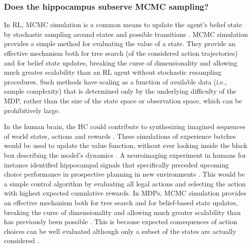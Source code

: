 \documentclass[10pt,letterpaper]{article}
\begin{document}
\subsubsection{Does the hippocampus subserve MCMC sampling?}
In RL, MCMC simulation is a common means to update the agent's belief state
by stochastic sampling around states and possible transitions \citep{daw2014algorithmic}.
MCMC simulation provides a simple method for evaluating the value of a state.
They provide an effective mechanism both for tree search (of the considered
action trajectories)
and for belief state updates, breaking the curse of dimensionality and allowing much greater scalability than an RL agent without stochastic resampling procedures.
Such methods have scaling as a function of available data (i.e., sample complexity) that
is determined only by the underlying difficulty of the MDP, rather than the size of the state space or observation space,
which can be prohibitively large.

In the human brain,
the HC could contribute to synthesizing imagined sequences of world states,
actions and rewards \citep{aronov2017, chao2017interaction, boyer2008evolutionary}.
These simulations of experience batches
would be used to update the value function, without ever looking inside the black box describing the model's dynamics \citep{lavilleon2015}.
A neuroimaging experiment in humans for instance identified hippocampal signals that specifically preceded upcoming choice performance in prospective planning in new environments
\citep{kaplan2017neural}.
This would be a simple control algorithm by evaluating all legal actions and selecting the action with
highest expected cumulative rewards.
In MDPs, MCMC simulation provides an effective mechanism both for tree search and for belief-based state updates, breaking the curse of dimensionality and allowing much greater scalability than has previously been possible \citep{silver2016mastering}.
This is because expected consequences of action choices can be well evaluated although only a subset of the states are actually considered \citep{daw2014algorithmic}.
\end{document}
